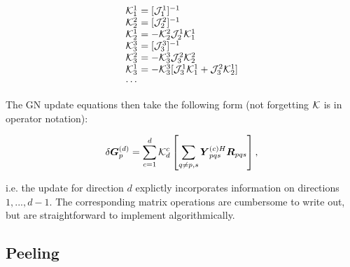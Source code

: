 \documentclass[useAMS,usenatbib]{mn2e}
\newcommand{\mat}[1]{{\bmath{#1}}}
\newcommand{\RR}{\mat{R}}
\newcommand{\GG}{\mat{G}}
\begin{document}
\[
\begin{array}{l@{~}l}
\KKK^1_1 &= [\JJJ^1_1]^{-1} \\
\KKK^2_2 &= [\JJJ^2_2]^{-1} \\
\KKK^1_2 &= - \KKK^2_2 \JJJ^1_2 \KKK^1_1\\
\KKK^3_3 &= [\JJJ^3_3]^{-1} \\
\KKK^2_3 &= - \KKK^3_3 \JJJ^2_3 \KKK^2_2\\
\KKK^1_3 &= - \KKK^3_3 [ \JJJ^1_3 \KKK^1_1 + \JJJ^2_3 \KKK^1_2  ]\\
\cdots
\end{array}
\]

The GN update equations then take the following form (not forgetting $\mathcal{K}$ is in operator notation):

\[
\delta \GG^{(d)}_p = \sum\limits_{c=1}^d \KKK^c_d \left [ \sum\limits_{q\ne p,s} \YY^{(c)H}_{pqs} \RR_{pqs}  \right ],
\]

i.e. the update for direction $d$ explictly incorporates information on directions $1,...,d-1$. The corresponding matrix operations 
are cumbersome to write out, but are straightforward to implement algorithmically.








\subsection{Peeling}
\end{document}
